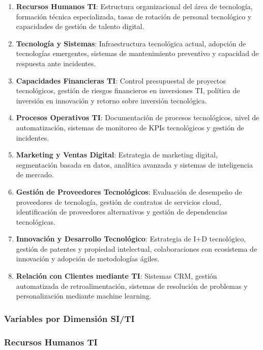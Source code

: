 \begin{enumerate}
\item \textbf{Recursos Humanos TI}: Estructura organizacional del área de tecnología, formación técnica especializada, tasas de rotación de personal tecnológico y capacidades de gestión de talento digital.

\item \textbf{Tecnología y Sistemas}: Infraestructura tecnológica actual, adopción de tecnologías emergentes, sistemas de mantenimiento preventivo y capacidad de respuesta ante incidentes.

\item \textbf{Capacidades Financieras TI}: Control presupuestal de proyectos tecnológicos, gestión de riesgos financieros en inversiones TI, política de inversión en innovación y retorno sobre inversión tecnológica.

\item \textbf{Procesos Operativos TI}: Documentación de procesos tecnológicos, nivel de automatización, sistemas de monitoreo de KPIs tecnológicos y gestión de incidentes.

\item \textbf{Marketing y Ventas Digital}: Estrategia de marketing digital, segmentación basada en datos, analítica avanzada y sistemas de inteligencia de mercado.

\item \textbf{Gestión de Proveedores Tecnológicos}: Evaluación de desempeño de proveedores de tecnología, gestión de contratos de servicios cloud, identificación de proveedores alternativos y gestión de dependencias tecnológicas.

\item \textbf{Innovación y Desarrollo Tecnológico}: Estrategia de I+D tecnológico, gestión de patentes y propiedad intelectual, colaboraciones con ecosistema de innovación y adopción de metodologías ágiles.

\item \textbf{Relación con Clientes mediante TI}: Sistemas CRM, gestión automatizada de retroalimentación, sistemas de resolución de problemas y personalización mediante machine learning.
\end{enumerate}

\subsubsection{Variables por Dimensión SI/TI}

\subsubsection{Recursos Humanos TI}

